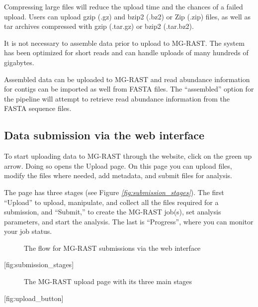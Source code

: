 \documentclass[letterpaper,10pt,english]{sphinxmanual}
\begin{document}
Compressing large files will reduce the upload time and the chances of a
failed upload. Users can upload gzip (.gz) and bzip2 (.bz2) or Zip
(.zip) files, as well as tar archives compressed with gzip (.tar.gz) or
bzip2 (.tar.bz2).

It is not necessary to assemble data prior to upload to MG-RAST. The
system has been optimized for short reads and can handle uploads of many
hundreds of gigabytes.

Assembled data can be uploaded to MG-RAST and read abundance information
for contigs can be imported as well from FASTA files. The “assembled”
option for the pipeline will attempt to retrieve read abundance
information from the FASTA sequence files.


\subsection{Data submission via the web interface}
\label{\detokenize{faq:data-submission-via-the-web-interface}}
To start uploading data to MG-RAST through the website, click on the
green up arrow. Doing so opens the Upload page. On this page you can
upload files, modify the files where needed, add metadata, and submit
files for analysis.

The page has three stages (see Figure
{\hyperref[\detokenize{faq:fig:submission_stages}]{\emph{{[}fig:submission\_stages{]}}}}). The first
“Upload” to upload, manipulate, and collect all the files required for a
submission, and “Submit,” to create the MG-RAST job(s), set analysis
parameters, and start the analysis. The last is “Progress”, where you
can monitor your job status.

\begin{figure}[htbp]
\centering
\capstart

\noindent{}
\caption{The flow for MG-RAST submissions via the web interface}\label{\detokenize{faq:id2}}\end{figure}

{[}fig:submission\_stages{]}

\begin{figure}[htbp]
\centering
\capstart

\noindent{}
\caption{The MG-RAST upload page with its three main stages}\label{\detokenize{faq:id3}}\end{figure}

{[}fig:upload\_button{]}
\end{document}
